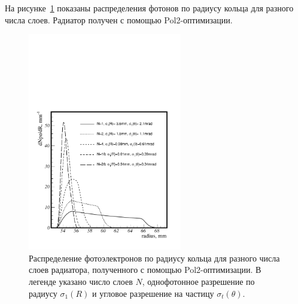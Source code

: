 \documentclass[12pt]{article}
\begin{document}
На рисунке~\ref{fig:hradlayers} показаны распределения фотонов по радиусу кольца для разного числа слоев. Радиатор получен с помощью Pol2-оптимизации.
\begin{figure}[htbp]
\begin{center}
\includegraphics[width=0.6\textwidth]{hrad_varlayers_pol2opt.pdf}
\caption{Распределение фотоэлектронов по радиусу кольца для разного числа слоев радиатора, полученного с помощью Pol2-оптимизации. 
В легенде указано число слоев $N$, однофотонное разрешение по радиусу $\sigma_1(R)$ и угловое разрешение на частицу $\sigma_t(\theta)$.}
\label{fig:hradlayers}
\end{center}
\end{figure}
\end{document}
